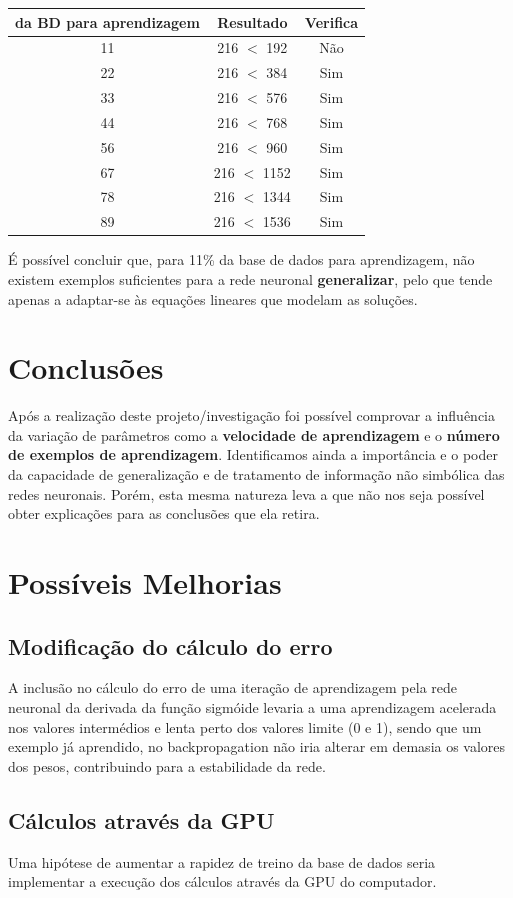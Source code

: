 \documentclass[10pt,a4paper]{article}
\begin{document}
\begin{tabular}{|c|c|c|}
\hline 
da BD para aprendizagem & Resultado & Verifica \\ 
\hline 
11 & 216 $<$ 192 & Não \\ 
22 & 216 $<$ 384 & Sim \\ 
33 & 216 $<$ 576 & Sim \\ 
44 & 216 $<$ 768 & Sim \\ 
56 & 216 $<$ 960 & Sim \\ 
67 & 216 $<$ 1152 & Sim \\ 
78 & 216 $<$ 1344 & Sim \\ 
89 & 216 $<$ 1536 & Sim \\ 
\hline
\end{tabular} 

É possível concluir que, para 11\% da base de dados para aprendizagem, não existem exemplos suficientes para a rede neuronal \textbf{generalizar}, pelo que tende apenas a adaptar-se às equações lineares que modelam as soluções.


\section{Conclusões}

Após a realização deste projeto/investigação foi possível comprovar a influência da variação de parâmetros como a \textbf{velocidade de aprendizagem} e o \textbf{número de exemplos de aprendizagem}. Identificamos ainda a importância e o poder da capacidade de generalização e de tratamento de informação não simbólica das redes neuronais. Porém, esta mesma natureza leva a que não nos seja possível obter explicações para as conclusões que ela retira.

\section{Possíveis Melhorias}
\subsection{Modificação do cálculo do erro}
A inclusão no cálculo do erro de uma iteração de aprendizagem pela rede neuronal da derivada da função sigmóide levaria a uma aprendizagem acelerada nos valores intermédios e lenta perto dos valores limite (0 e 1), sendo que um exemplo já aprendido, no backpropagation não iria alterar em demasia os valores dos pesos, contribuindo para a estabilidade da rede. 

\subsection{Cálculos através da GPU}
Uma hipótese de aumentar a rapidez de treino da base de dados seria implementar a execução dos cálculos através da GPU do computador.
\end{document}
